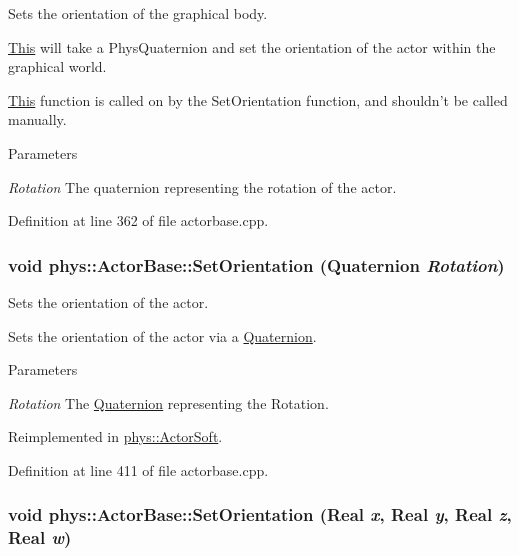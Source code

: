 Sets the orientation of the graphical body. 

\hyperlink{structThis}{This} will take a PhysQuaternion and set the orientation of the actor within the graphical world. \par
 \hyperlink{structThis}{This} function is called on by the SetOrientation function, and shouldn't be called manually. 
\begin{DoxyParams}{Parameters}
\item[{\em Rotation}]The quaternion representing the rotation of the actor. \end{DoxyParams}


Definition at line 362 of file actorbase.cpp.

\hypertarget{classphys_1_1ActorBase_ac4b0bf1eff730d94f72d04957efea69d}{
\subsubsection[{SetOrientation}]{\setlength{\rightskip}{0pt plus 5cm}void phys::ActorBase::SetOrientation ({\bf Quaternion} {\em Rotation})}}
\label{d8/d0f/classphys_1_1ActorBase_ac4b0bf1eff730d94f72d04957efea69d}


Sets the orientation of the actor. 

Sets the orientation of the actor via a \hyperlink{classphys_1_1Quaternion}{Quaternion}. 
\begin{DoxyParams}{Parameters}
\item[{\em Rotation}]The \hyperlink{classphys_1_1Quaternion}{Quaternion} representing the Rotation. \end{DoxyParams}


Reimplemented in \hyperlink{classphys_1_1ActorSoft_ad57b502da0658de31a4b3a9bb9be7900}{phys::ActorSoft}.



Definition at line 411 of file actorbase.cpp.

\hypertarget{classphys_1_1ActorBase_adbf0cc77031f22597a799fd0f7f8216d}{
\subsubsection[{SetOrientation}]{\setlength{\rightskip}{0pt plus 5cm}void phys::ActorBase::SetOrientation ({\bf Real} {\em x}, \/  {\bf Real} {\em y}, \/  {\bf Real} {\em z}, \/  {\bf Real} {\em w})}}
\label{d8/d0f/classphys_1_1ActorBase_adbf0cc77031f22597a799fd0f7f8216d}


